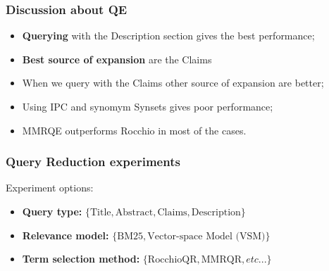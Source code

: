 \documentclass[xcolor=x11names,compress]{beamer}
\renewcommand{\(}{\begin{columns}}
\renewcommand{\)}{\end{columns}}
\newcommand{\<}[1]{\begin{column}{#1}}
\renewcommand{\>}{\end{column}}
\begin{document}
\begin{frame}
\frametitle{Discussion about QE}

\begin{itemize}
\item \textbf{Querying} with the Description section gives the best performance;
\item \textbf{Best source of expansion} are the Claims
\item When we query with the Claims other source of expansion are better;
\item Using IPC and synomym Synsets gives poor performance;
\item MMRQE outperforms Rocchio in most of the cases.
\end{itemize}

\end{frame}




\begin{frame}
\frametitle{Query Reduction experiments}
Experiment options:
\begin{itemize}
\item \textbf{\footnotesize{}Query type:}{\footnotesize{} $\{\mathrm{Title},\mathrm{Abstract},\mathrm{Claims},\mathrm{Description}\}$ }{\footnotesize \par}
\item \textbf{\footnotesize{}Relevance model:}{\footnotesize{} $\{\mathrm{BM25},\mbox{Vector-space Model (VSM)}\}$ }{\footnotesize \par}
\item \textbf{\footnotesize{}Term selection method:}{\footnotesize{} $\{\mathrm{RocchioQR},\mathrm{MMRQR},etc...\}$ }{\footnotesize \par}
\end{itemize}
\end{frame}
\end{document}
